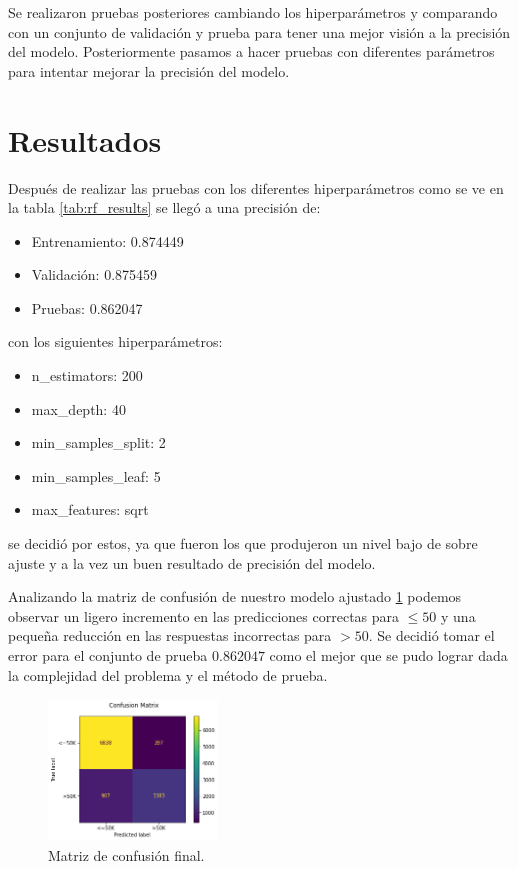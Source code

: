 \documentclass[twocolumn]{article}
\begin{document}
Se realizaron pruebas posteriores cambiando
los hiperparámetros y comparando con un conjunto de validación y prueba para tener 
una mejor visión a la precisión del modelo. Posteriormente pasamos a hacer pruebas
con diferentes parámetros para intentar mejorar la precisión del modelo.


\section{Resultados}
Después de realizar las pruebas con los diferentes hiperparámetros como se ve en
la tabla \ref{tab:rf_results} se llegó a una precisión de:

\begin{itemize}
  \item Entrenamiento: 0.874449 
  \item Validación: 0.875459 
  \item Pruebas: 0.862047
\end{itemize}
con los siguientes hiperparámetros:

\begin{itemize}
  \item n\_estimators: 200
  \item max\_depth: 40
  \item min\_samples\_split: 2
  \item min\_samples\_leaf: 5
  \item max\_features: sqrt
\end{itemize}
se decidió por estos, ya que fueron los que produjeron un nivel bajo de sobre ajuste
y a la vez un buen resultado de precisión del modelo.

Analizando la matriz de confusión de nuestro modelo ajustado \ref{fig:conf2}
podemos observar un ligero incremento en las predicciones correctas para $\leq50$
y una pequeña reducción en las respuestas incorrectas para $>50$. Se decidió tomar
el error para el conjunto de prueba $0.862047$ como el mejor que se pudo lograr
dada la complejidad del problema y el método de prueba.

\begin{figure}[!ht]
\centering
\includegraphics[width=0.4\textwidth]{assets/conf2.png}
\caption{Matriz de confusión final.}
\label{fig:conf2}
\end{figure}
\end{document}
